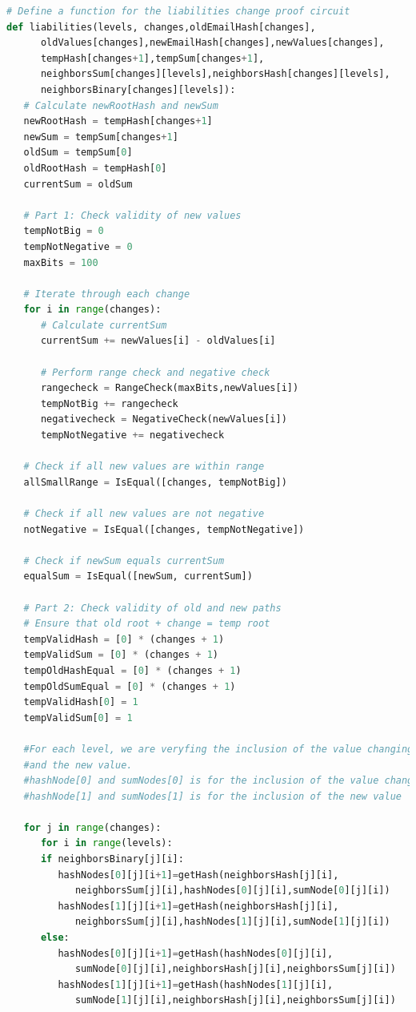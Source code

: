 \begin{lstlisting}[language=Python, caption=Liabilities change circuit pseudocode]
# Define a function for the liabilities change proof circuit
def liabilities(levels, changes,oldEmailHash[changes],
      oldValues[changes],newEmailHash[changes],newValues[changes],
      tempHash[changes+1],tempSum[changes+1],
      neighborsSum[changes][levels],neighborsHash[changes][levels],
      neighborsBinary[changes][levels]):         
   # Calculate newRootHash and newSum
   newRootHash = tempHash[changes+1]
   newSum = tempSum[changes+1]
   oldSum = tempSum[0]
   oldRootHash = tempHash[0]
   currentSum = oldSum

   # Part 1: Check validity of new values
   tempNotBig = 0
   tempNotNegative = 0
   maxBits = 100

   # Iterate through each change
   for i in range(changes):
      # Calculate currentSum
      currentSum += newValues[i] - oldValues[i]

      # Perform range check and negative check
      rangecheck = RangeCheck(maxBits,newValues[i])
      tempNotBig += rangecheck
      negativecheck = NegativeCheck(newValues[i])
      tempNotNegative += negativecheck

   # Check if all new values are within range
   allSmallRange = IsEqual([changes, tempNotBig])

   # Check if all new values are not negative
   notNegative = IsEqual([changes, tempNotNegative])

   # Check if newSum equals currentSum
   equalSum = IsEqual([newSum, currentSum])

   # Part 2: Check validity of old and new paths
   # Ensure that old root + change = temp root
   tempValidHash = [0] * (changes + 1)
   tempValidSum = [0] * (changes + 1)
   tempOldHashEqual = [0] * (changes + 1)
   tempOldSumEqual = [0] * (changes + 1)
   tempValidHash[0] = 1
   tempValidSum[0] = 1

   #For each level, we are veryfing the inclusion of the value changing
   #and the new value.
   #hashNode[0] and sumNodes[0] is for the inclusion of the value changing
   #hashNode[1] and sumNodes[1] is for the inclusion of the new value

   for j in range(changes):
      for i in range(levels):
      if neighborsBinary[j][i]:
         hashNodes[0][j][i+1]=getHash(neighborsHash[j][i],
            neighborsSum[j][i],hashNodes[0][j][i],sumNode[0][j][i])
         hashNodes[1][j][i+1]=getHash(neighborsHash[j][i],
            neighborsSum[j][i],hashNodes[1][j][i],sumNode[1][j][i])
      else:
         hashNodes[0][j][i+1]=getHash(hashNodes[0][j][i],
            sumNode[0][j][i],neighborsHash[j][i],neighborsSum[j][i])
         hashNodes[1][j][i+1]=getHash(hashNodes[1][j][i],
            sumNode[1][j][i],neighborsHash[j][i],neighborsSum[j][i])


\end{lstlisting}
